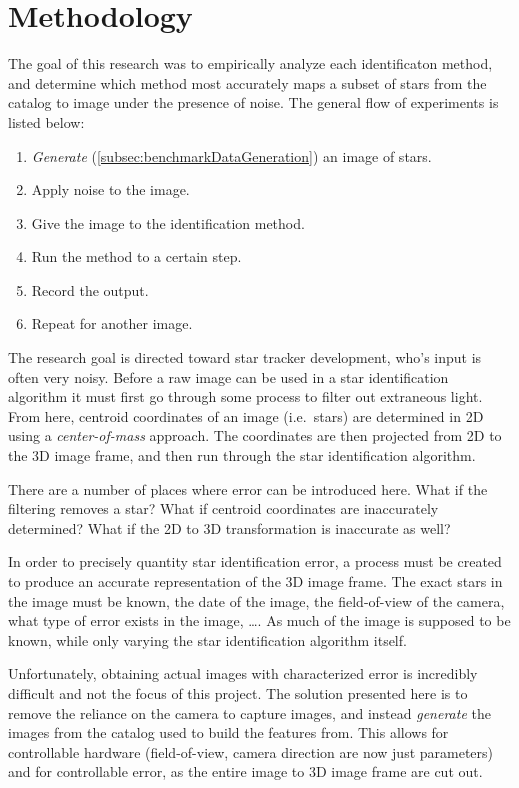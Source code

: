 \newcommand{\itmref}[2]{\hyperref[#2]{#1 Variable~\ref*{#2}}}

\section{Methodology}\label{sec:methodology}
The goal of this research was to empirically analyze each identificaton method, and determine which method most
accurately maps a subset of stars from the catalog to image under the presence of noise.
The general flow of experiments is listed below:
\begin{enumerate}
    \item \textit{Generate} (\autoref{subsec:benchmarkDataGeneration}) an image of stars.
    \item Apply noise to the image.
    \item Give the image to the identification method.
    \item Run the method to a certain step.
    \item Record the output.
    \item Repeat for another image.
\end{enumerate}

The research goal is directed toward star tracker development, who's input is often very noisy.
Before a raw image can be used in a star identification algorithm it must first go through some process to filter out
extraneous light.
From here, centroid coordinates of an image (i.e.\ stars) are determined in 2D using a \textit{center-of-mass} approach.
The coordinates are then projected from 2D to the 3D image frame, and then run through the star identification
algorithm.

There are a number of places where error can be introduced here.
What if the filtering removes a star?
What if centroid coordinates are inaccurately determined?
What if the 2D to 3D transformation is inaccurate as well?

In order to precisely quantity star identification error, a process must be created to produce an accurate
representation of the 3D image frame.
The exact stars in the image must be known, the date of the image, the field-of-view of the camera, what type of
error exists in the image, \ldots.
As much of the image is supposed to be known, while only varying the star identification algorithm itself.

Unfortunately, obtaining actual images with characterized error is incredibly difficult and not the focus of this
project.
The solution presented here is to remove the reliance on the camera to capture images, and instead
\textit{generate} the images from the catalog used to build the features from.
This allows for controllable hardware (field-of-view, camera direction are now just parameters) and for controllable
error, as the entire image to 3D image frame are cut out.

